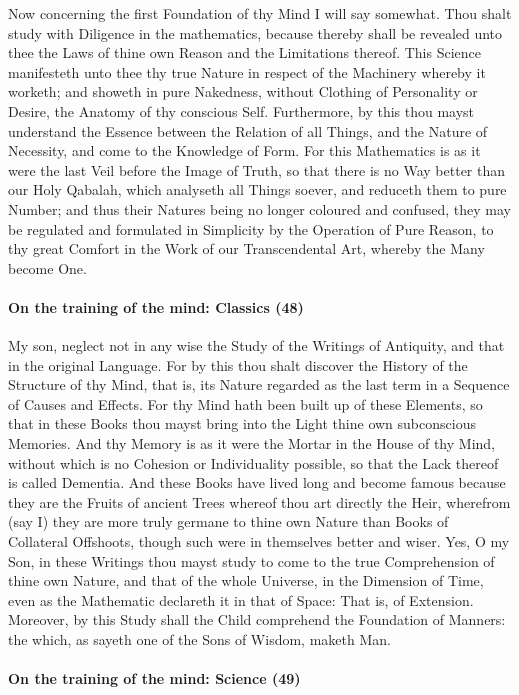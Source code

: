 Now concerning the first Foundation of thy Mind I will say somewhat. Thou shalt study with Diligence in the mathematics, because thereby shall be revealed unto thee the Laws of thine own Reason and the Limitations thereof. This Science manifesteth unto thee thy true Nature in respect of the Machinery whereby it worketh; and showeth in pure Nakedness, without Clothing of Personality or Desire, the Anatomy of thy conscious Self. Furthermore, by this thou mayst understand the Essence between the Relation of all Things, and the Nature of Necessity, and come to the Knowledge of Form. For this Mathematics is as it were the last Veil before the Image of Truth, so that there is no Way better than our Holy Qabalah, which analyseth all Things soever, and reduceth them to pure Number; and thus their Natures being no longer coloured and confused, they may be regulated and formulated in Simplicity by the Operation of Pure Reason, to thy great Comfort in the Work of our Transcendental Art, whereby the Many become One.

\paragraph{On the training of the mind: Classics (48)}


My son, neglect not in any wise the Study of the Writings of Antiquity, and that in the original Language. For by this thou shalt discover the History of the Structure of thy Mind, that is, its Nature regarded as the last term in a Sequence of Causes and Effects. For thy Mind hath been built up of these Elements, so that in these Books thou mayst bring into the Light thine own subconscious Memories. And thy Memory is as it were the Mortar in the House of thy Mind, without which is no Cohesion or Individuality possible, so that the Lack thereof is called Dementia. And these Books have lived long and become famous because they are the Fruits of ancient Trees whereof thou art directly the Heir, wherefrom (say I) they are more truly germane to thine own Nature than Books of Collateral Offshoots, though such were in themselves better and wiser. Yes, O my Son, in these Writings thou mayst study to come to the true Comprehension of thine own Nature, and that of the whole Universe, in the Dimension of Time, even as the Mathematic declareth it in that of Space: That is, of Extension. Moreover, by this Study shall the Child comprehend the Foundation of Manners: the which, as sayeth one of the Sons of Wisdom, maketh Man.

\paragraph{On the training of the mind: Science (49)}


